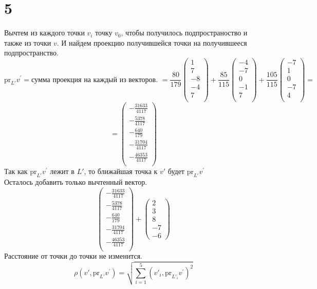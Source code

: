 \section*{5}
Вычтем из каждого точки $v_i$ точку $v_0$, чтобы получилось подпространоство и также из точки $v$. И найдем проекцию получившейся точки на получившееся подпространство. \\
$$\text{pr}_{L'}v^{'} = \text{сумма проекция на каждый из векторов. } = \frac{80}{179}\begin{pmatrix}1\\7\\ -8\\ -4\\ 7\\\end{pmatrix} + \frac{85}{115}\begin{pmatrix}-4\\-7\\ 0\\ -1\\ 7\\\end{pmatrix} + \frac{105}{115}\begin{pmatrix}-7\\1\\ 0\\ -7\\ 4\\\end{pmatrix} =  $$
$$=\begin{pmatrix}-\frac{31633}{4117}\\-\frac{5378}{4117}\\ -\frac{640}{179}\\ -\frac{31704}{4117}\\ -\frac{46353}{4117}\\\end{pmatrix}$$
Так как $\text{pr}_{L'}v^{'}$ лежит в $L'$, то ближайшая точка к $v'$ будет $\text{pr}_{L'}v^{'}$ \\
Осталось добавить только вычтенный вектор. \\
$$\begin{pmatrix}-\frac{31633}{4117}\\-\frac{5378}{4117}\\ -\frac{640}{179}\\ -\frac{31704}{4117}\\ -\frac{46353}{4117}\\\end{pmatrix} + \begin{pmatrix}2 \\ 3 \\8 \\-7 \\-6\end{pmatrix}$$
 Расстояние от точки до точки не изменится. 
$$\rho(v', \text{pr}_{L'}v^{'}) = \sqrt{\sum_{i=1}^5 (v'_i, \text{pr}_{L'_i}v^{'})^2}$$
